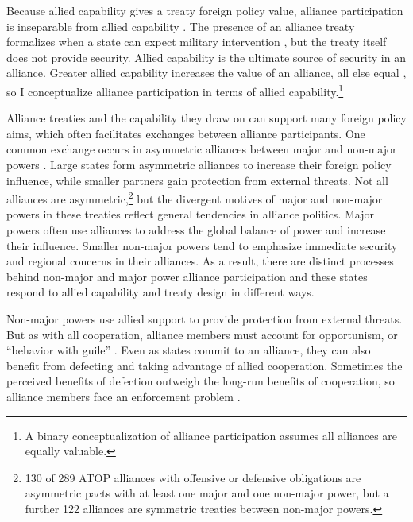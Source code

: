 \documentclass[12pt]{article}
\begin{document}
Because allied capability gives a treaty foreign policy value, alliance participation is inseparable from allied capability \citep{FordhamPoast2014}. 
The presence of an alliance treaty formalizes when a state can expect military intervention \citep{Morrow2000}, but the treaty itself does not provide security. 
Allied capability is the ultimate source of security in an alliance. 
Greater allied capability increases the value of an alliance, all else equal \citep{Johnsonetal2015}, so I conceptualize alliance participation in terms of allied capability.\footnote{A binary conceptualization of alliance participation assumes all alliances are equally valuable.}


Alliance treaties and the capability they draw on can support many foreign policy aims, which often facilitates exchanges between alliance participants. 
One common exchange occurs in asymmetric alliances between major and non-major powers \citep{Morrow1991}. 
Large states form asymmetric alliances to increase their foreign policy influence, while smaller partners gain protection from external threats. 
Not all alliances are asymmetric,\footnote{130 of 289 ATOP alliances with offensive or defensive obligations are asymmetric pacts with at least one major and one non-major power, but a further 122 alliances are symmetric treaties between non-major powers.} but the divergent motives of major and non-major powers in these treaties reflect general tendencies in alliance politics. 
Major powers often use alliances to address the global balance of power and increase their influence. 
Smaller non-major powers tend to emphasize immediate security and regional concerns in their alliances. 
As a result, there are distinct processes behind non-major and major power alliance participation and these states respond to allied capability and treaty design in different ways. 


Non-major powers use allied support to provide protection from external threats. 
But as with all cooperation, alliance members must account for opportunism, or ``behavior with guile'' \citep{Williamson1985}. 
Even as states commit to an alliance, they can also benefit from defecting and taking advantage of allied cooperation. 
Sometimes the perceived benefits of defection outweigh the long-run benefits of cooperation, so alliance members face an enforcement problem \citep{Fearon1998a, Koremenosetal2001}.
\end{document}
